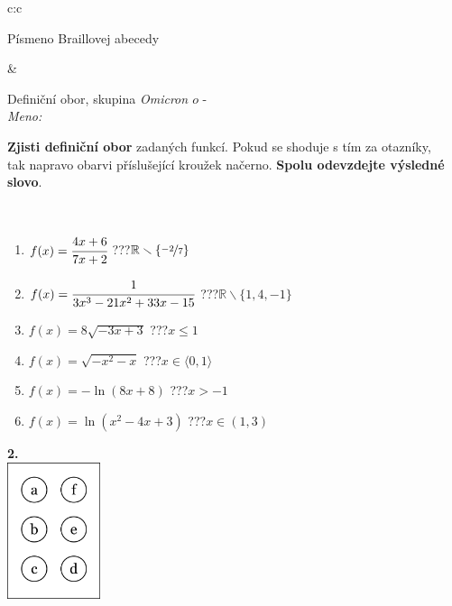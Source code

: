 \documentclass[10pt]{report}
\newcommand\omicron{o}
\begin{document}
\begin{tabular}{c:c}
\begin{minipage}[c][104.5mm][t]{0.5\linewidth}
\begin{center}
\begin{minipage}{0.20\linewidth}
\begin{center}
{\small Písmeno Braillovej abecedy}
\end{center}
\end{minipage}
\end{center}
\end{minipage}
&
\begin{minipage}[c][104.5mm][t]{0.5\linewidth}
\begin{center}
\vspace{7mm}
{\huge Definiční obor, skupina \textit{Omicron $\omicron$} -}\\[5mm]
\textit{Meno:}\phantom{xxxxxxxxxxxxxxxxxxxxxxxxxxxxxxxxxxxxxxxxxxxxxxxxxxxxxxxxxxxxxxxxx}\\[5mm]
\begin{minipage}{0.95\linewidth}
\textbf{Zjisti definiční obor} zadaných funkcí. Pokud se shoduje s tím za otazníky,\\tak napravo obarvi příslušející kroužek načerno. \textbf{Spolu odevzdejte výsledné slovo}.
\end{minipage}
\\[1mm]
\begin{minipage}{0.79\linewidth}
\begin{center}
\begin{varwidth}{\linewidth}
\begin{enumerate}
\normalsizerrr
\item $f(x)=\cfrac{4x+6}{7x+2}$\quad \dotfill\; ???\;\dotfill \quad $\mathbb{R}\smallsetminus\{\nicefrac{-2}{7}\}$
\item $f(x)=\cfrac{1}{3x^3-21x^2+33x-15}$\quad \dotfill\; ???\;\dotfill \quad $\mathbb{R}\smallsetminus\{1,4,-1\}$
\item $f(x)=8\sqrt{-3x+3}$\quad \dotfill\; ???\;\dotfill \quad $x\leq1$
\item $f(x)=\sqrt{-x^2-x}$\quad \dotfill\; ???\;\dotfill \quad $x\in\langle0 , 1\rangle$
\item $f(x)=-\ln{(8x+8)}$\quad \dotfill\; ???\;\dotfill \quad $x>-1$
\item $f(x)=\ln{(x^2-4x+3)}$\quad \dotfill\; ???\;\dotfill \quad $x\in(1 , 3)$
\end{enumerate}
\end{varwidth}
\end{center}
\end{minipage}
\begin{minipage}{0.20\linewidth}
\begin{center}
{\Huge\bfseries 2.} \\[2mm]
\includegraphics[height=40mm]{../images/braille.png}

\end{center}
\end{minipage}
\end{center}
\end{minipage}
\end{tabular}
\end{document}
